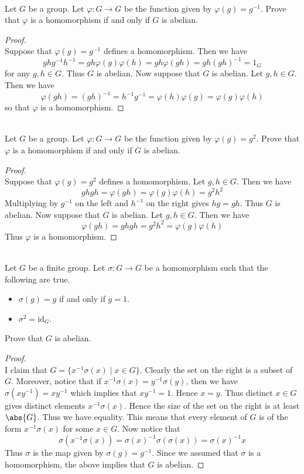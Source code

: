 \documentclass[a4paper]{article}
\begin{document}
\begin{eg}{}{}\\
Let $G$ be a group. Let $\varphi:G\to G$ be the function given by $\varphi(g)=g^{-1}$. Prove that $\varphi$ is a homomorphism if and only if $G$ is abelian. 
\begin{proof}\\
Suppose that $\varphi(g)=g^{-1}$ defines a homomorphism. Then we have $$ghg^{-1}h^{-1}=gh\varphi(g)\varphi(h)=gh\varphi(gh)=gh(gh)^{-1}=1_G$$ for any $g,h\in G$. Thus $G$ is abelian. Now suppose that $G$ is abelian. Let $g,h\in G$. Then we have $$\varphi(gh)=(gh)^{-1}=h^{-1}g^{-1}=\varphi(h)\varphi(g)=\varphi(g)\varphi(h)$$ so that $\varphi$ is a homomorphism. 
\end{proof}
\end{eg}

\begin{eg}{}{}\\
Let $G$ be a group. Let $\varphi:G\to G$ be the function given by $\varphi(g)=g^2$. Prove that $\varphi$ is a homomorphism if and only if $G$ is abelian. 
\begin{proof}\\
Suppose that $\varphi(g)=g^2$ defines a homomorphism. Let $g,h\in G$. Then we have $$ghgh=\varphi(gh)=\varphi(g)\varphi(h)=g^2h^2$$ Multiplying by $g^{-1}$ on the left and $h^{-1}$ on the right gives $hg=gh$. Thus $G$ is abelian. Now suppose that $G$ is abelian. Let $g,h\in G$. Then we have $$\varphi(gh)=ghgh=g^2h^2=\varphi(g)\varphi(h)$$ Thus $\varphi$ is a homomorphism. 
\end{proof}
\end{eg}

\begin{eg}{}{}\\
Let $G$ be a finite group. Let $\sigma:G\to G$ be a homomorphism such that the following are true. 
\begin{itemize}
\item $\sigma(g)=g$ if and only if $g=1$. 
\item $\sigma^2=\text{id}_G$. 
\end{itemize}
Prove that $G$ is abelian. 
\begin{proof}\\
I claim that $G=\{x^{-1}\sigma(x)\;|\;x\in G\}$. Clearly the set on the right is a subset of $G$. Moreover, notice that if $x^{-1}\sigma(x)=y^{-1}\sigma(y)$, then we have $\sigma(xy^{-1})=xy^{-1}$ which implies that $xy^{-1}=1$. Hence $x=y$. Thus distinct $x\in G$ gives distinct elements $x^{-1}\sigma(x)$. Hence the size of the set on the right is at least $\abs{G}$. Thus we have equality. This means that every element of $G$ is of the form $x^{-1}\sigma(x)$ for some $x\in G$. Now notice that $$\sigma(x^{-1}\sigma(x))=\sigma(x)^{-1}\sigma(\sigma(x))=\sigma(x)^{-1}x$$ Thus $\sigma$ is the map given by $\sigma(g)=g^{-1}$. Since we assumed that $\sigma$ is a homomorphism, the above implies that $G$ is abelian. 
\end{proof}
\end{eg}
\end{document}
